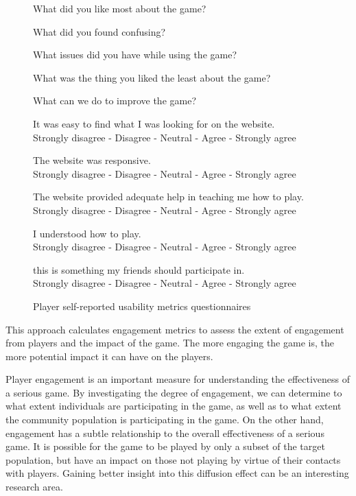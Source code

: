 \begin{figure}[ht!]
\begin{mybox}
\begin{compactenum}
\item What did you like most about the game?
\item What did you found confusing?
\item What issues did you have while using the game?
\item What was the thing you liked the least about the game?
\item What can we do to improve the game?
\item It was easy to find what I was looking for on the website.  \\
	Strongly disagree  -  Disagree  -  Neutral  -  Agree  -  Strongly agree
\item The website was responsive. \\
	Strongly disagree  -  Disagree  -  Neutral  -  Agree  -  Strongly agree
\item The website provided adequate help in teaching me how to play. \\
	Strongly disagree  -  Disagree  -  Neutral  -  Agree  -  Strongly agree
\item I understood how to play. \\
	Strongly disagree  -  Disagree  -  Neutral  -  Agree  -  Strongly agree
\item this is something my friends should participate in. \\
	Strongly disagree  -  Disagree  -  Neutral  -  Agree  -  Strongly agree
\end{compactenum}
\end{mybox}
\caption{Player self-reported usability metrics questionnaires}
\label{fig:usability-metrics}  
\end{figure}

\label{Engagement metrics}

This approach calculates engagement metrics to assess the extent of engagement from players and 
the impact of the game. The more engaging the game is, the more potential impact it can have on the players.

Player engagement is an important measure for understanding the effectiveness of a serious game.
By investigating the degree of engagement, we can determine to what extent individuals are
participating in the game, as well as to what extent the community population is participating in
the game. On the other hand, engagement has a subtle relationship to the overall effectiveness of a 
serious game. It is possible for the game to be played by only a subset of the target population, but
have an impact on those not playing by virtue of their contacts with players. Gaining
better insight into this diffusion effect can be an interesting research area. 

